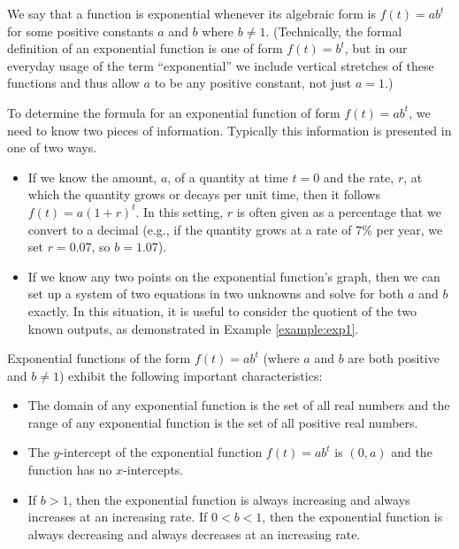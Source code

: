 \documentclass[nooutcomes]{ximera}
\begin{document}
\begin{summary}
\item We say that a function is exponential whenever its algebraic form is \(f(t) = ab^t\) for some positive constants \(a\) and \(b\) where \(b \ne 1\).  (Technically, the formal definition of an exponential function is one of form \(f(t) = b^t\), but in our everyday usage of the term ``exponential'' we include vertical stretches of these functions and thus allow \(a\) to be any positive constant, not just \(a = 1\).)
\item To determine the formula for an exponential function of form \(f(t) = ab^t\), we need to know two pieces of information.  Typically this information is presented in one of two ways.
\begin{itemize}
\item If we know the amount, \(a\), of a quantity at time \(t = 0\) and the rate, \(r\), at which the quantity grows or decays per unit time, then it follows \(f(t) = a(1+r)^t\).  In this setting, \(r\) is often given as a percentage that we convert to a decimal (e.g., if the quantity grows at a rate of \(7\)\% per year, we set \(r = 0.07\), so \(b = 1.07\)).
\item If we know any two points on the exponential function's graph, then we can set up a system of two equations in two unknowns and solve for both \(a\) and \(b\) exactly.  In this situation, it is useful to consider the quotient of the two known outputs, as demonstrated in Example \ref{example:exp1}.
\end{itemize}
\item Exponential functions of the form \(f(t) = ab^t\) (where \(a\) and \(b\) are both positive and \(b \ne 1\)) exhibit the following important characteristics:
\begin{itemize}
\item The domain of any exponential function is the set of all real numbers and the range of any exponential function is the set of all positive real numbers.
\item The \(y\)-intercept of the exponential function \(f(t) = ab^t\) is \((0,a)\) and the function has no \(x\)-intercepts.
\item If \(b \gt 1\), then the exponential function is always increasing and always increases at an increasing rate.  If \(0 \lt b \lt 1\), then the exponential function is always decreasing and always decreases at an increasing rate.
\end{itemize}
\end{summary}
\end{document}
